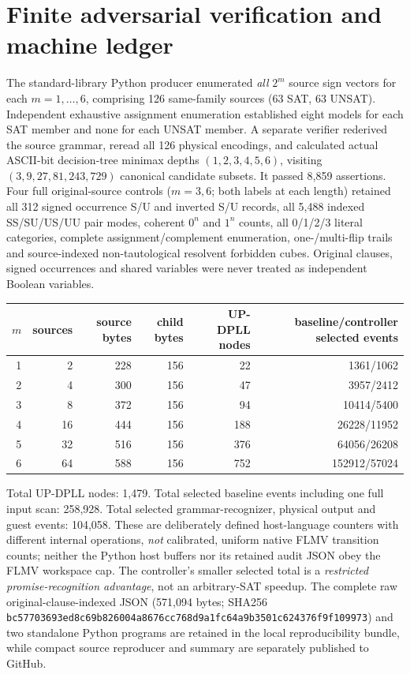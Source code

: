 \documentclass[11pt]{article}
\begin{document}
\section{Finite adversarial verification and machine ledger}
The standard-library Python producer enumerated \emph{all} $2^m$ source sign vectors for each $m=1,\ldots,6$, comprising 126 same-family sources (63 SAT, 63 UNSAT). Independent exhaustive assignment enumeration established eight models for each SAT member and none for each UNSAT member. A separate verifier rederived the source grammar, reread all 126 physical encodings, and calculated actual ASCII-bit decision-tree minimax depths $(1,2,3,4,5,6)$, visiting $(3,9,27,81,243,729)$ canonical candidate subsets. It passed 8,859 assertions.
Four full original-source controls ($m=3,6$; both labels at each length) retained all 312 signed occurrence S/U and inverted S/U records, all 5,488 indexed SS/SU/US/UU pair modes, coherent $0^n$ and $1^n$ counts, all 0/1/2/3 literal categories, complete assignment/complement enumeration, one-/multi-flip trails and source-indexed non-tautological resolvent forbidden cubes. Original clauses, signed occurrences and shared variables were never treated as independent Boolean variables.
\begin{center}\begin{tabular}{rrrrrr}
\toprule
$m$ & sources & source bytes & child bytes & UP-DPLL nodes & baseline/controller selected events\\ \midrule
1&2&228&156&22&1361/1062\\
2&4&300&156&47&3957/2412\\
3&8&372&156&94&10414/5400\\
4&16&444&156&188&26228/11952\\
5&32&516&156&376&64056/26208\\
6&64&588&156&752&152912/57024\\ \bottomrule
\end{tabular}\end{center}
Total UP-DPLL nodes: 1,479. Total selected baseline events including one full input scan: 258,928. Total selected grammar-recognizer, physical output and guest events: 104,058. These are deliberately defined host-language counters with different internal operations, \emph{not} calibrated, uniform native FLMV transition counts; neither the Python host buffers nor its retained audit JSON obey the FLMV workspace cap. The controller's smaller selected total is a \emph{restricted promise-recognition advantage}, not an arbitrary-SAT speedup. The complete raw original-clause-indexed JSON (571,094 bytes; SHA256 \texttt{bc57703693ed8c69b826004a8676cc768d9a1fc64a9b3501c624376f9f109973}) and two standalone Python programs are retained in the local reproducibility bundle, while compact source reproducer and summary are separately published to GitHub.
\end{document}
